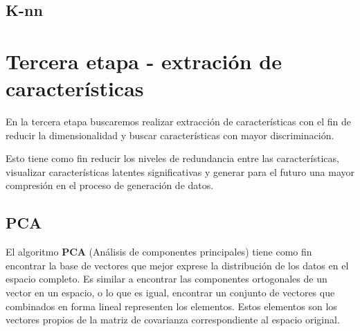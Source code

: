 \documentclass[12pt,a4paper,titlepage]{report}
\begin{document}
\subsection{K-nn}

\section{Tercera etapa - extración de características}

En la tercera etapa buscaremos realizar extracción de características con el fin de reducir la dimensionalidad y  buscar características con mayor discriminación. 

Esto tiene como fin reducir los niveles de redundancia entre las características, visualizar características latentes significativas y generar para el futuro una mayor compresión en el proceso de generación de datos. 

\subsection{PCA}

El algoritmo \textbf{PCA} (Análisis de componentes principales) tiene como fin encontrar la base de vectores que mejor exprese la distribución de los datos en el espacio completo. Es similar a encontrar las componentes ortogonales de un vector en un espacio, o lo que es igual, encontrar un conjunto de vectores que combinados en forma lineal representen los elementos. Estos elementos son los vectores propios de la matriz de covarianza correspondiente al espacio original.\\

\end{document}
